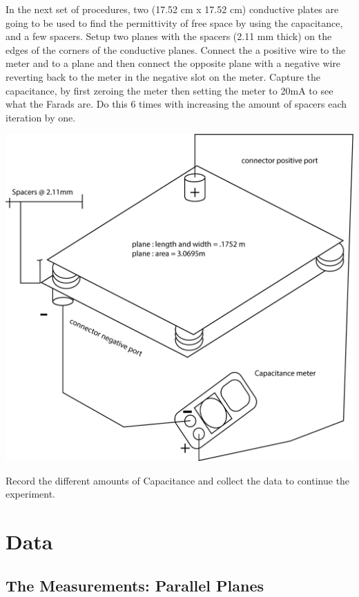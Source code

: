 \documentclass{article}
\begin{document}
In the next set of procedures, two (17.52 cm x 17.52 cm) conductive plates are going to be used to find the permittivity of free space by using the capacitance, and a few spacers. Setup two planes with the spacers (2.11 mm thick) on the edges of the corners of the conductive planes. Connect the a positive wire to the meter and to a plane and then connect the opposite plane with a negative wire reverting back to the meter in the negative slot on the meter. Capture the capacitance, by first zeroing the meter then setting the meter to 20mA to see what the Farads are. Do this 6 times with increasing the amount of spacers each iteration by one.  

{\textit{\footnotesize\selectfont{note: do not re-zero out the meter each iteration, do it only once.}}}
\begin{center}
    \includegraphics[scale=.4]{Images/parallel.png}
\end{center}
Record the different amounts of Capacitance and collect the data to continue the experiment.

\section*{Data}
\subsection*{The Measurements: Parallel Planes}
\end{document}
